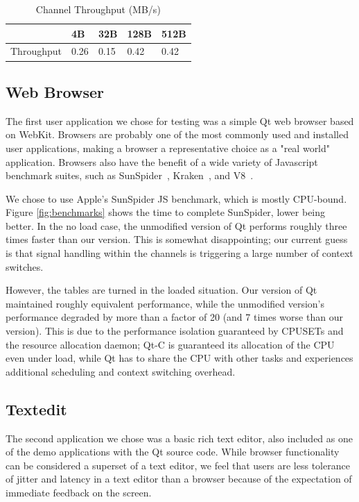 \documentclass[letterpaper,twocolumn,10pt]{article}
\begin{document}
\begin{table}[tp]
\caption{Channel Throughput (MB/s)}
\centering
\label{tab:channel_tput}
\begin{tabular}{|l | l | l | l | l |}
\hline
			&4B 	& 32B	& 128B	& 512B \\ \hline
Throughput	&0.26	&0.15	&0.42	& 0.42 \\
\hline
\end{tabular}
\end{table}


\subsection{Web Browser}

The first user application we chose for testing was a simple Qt web browser based on WebKit. Browsers are probably one of the most commonly used and installed user applications, making a browser a representative choice as a "real world" application. Browsers also have the benefit of a wide variety of Javascript benchmark suites, such as SunSpider~\cite{sunspider}, Kraken~\cite{kraken}, and V8~\cite{v8benchmark}.

We chose to use Apple's SunSpider JS benchmark, which is mostly CPU-bound. Figure \ref{fig:benchmarks} shows the time to complete SunSpider, lower being better. In the no load case, the unmodified version of Qt performs roughly three times faster than our version. This is somewhat disappointing; our current guess is that signal handling within the channels is triggering a large number of context switches.

However, the tables are turned in the loaded situation. Our version of Qt maintained roughly equivalent performance, while the unmodified version's performance degraded by more than a factor of 20 (and 7 times worse than our version). This is due to the performance isolation guaranteed by CPUSETs and the resource allocation daemon; Qt-C is guaranteed its allocation of the CPU even under load, while Qt has to share the CPU with other tasks and experiences additional scheduling and context switching overhead.

\subsection{Textedit}

The second application we chose was a basic rich text editor, also included as one of the demo applications with the Qt source code. While browser functionality can be considered a superset of a text editor, we feel that users are less tolerance of jitter and latency in a text editor than a browser because of the expectation of immediate feedback on the screen. 
\end{document}
